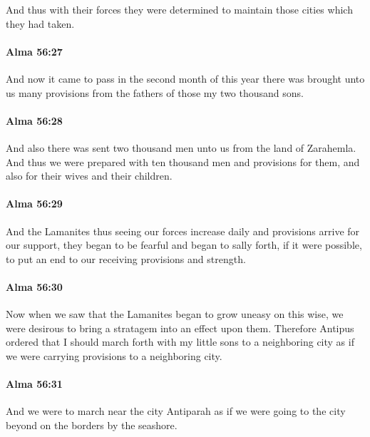 			And thus with their forces they were determined
			to maintain those cities which they had taken.

		\paragraph{Alma 56:27} %
			\label{ALMA-56-27}

			And now it came to pass in the second month of this year
			there was brought unto us many provisions
			from the fathers of those my two thousand sons.

		\paragraph{Alma 56:28} %
			\label{ALMA-56-28}

			And also there was sent two thousand men unto us from the land of Zarahemla.
			And thus we were prepared with ten thousand men
			and provisions for them, and also for their wives and their children.

		\paragraph{Alma 56:29} %
			\label{ALMA-56-29}

			And the Lamanites thus seeing our forces increase daily
			and provisions arrive for our support,
			they began to be fearful and began to sally forth,
			if it were possible, to put an end to our receiving provisions and strength.

		\paragraph{Alma 56:30} %
			\label{ALMA-56-30}

			Now when we saw that the Lamanites began to grow uneasy on this wise,
			we were desirous to bring a stratagem into an effect upon them.
			Therefore Antipus ordered that I should march forth
			with my little sons to a neighboring city
			as if we were carrying provisions to a neighboring city.

		\paragraph{Alma 56:31} %
			\label{ALMA-56-31}

			And we were to march near the city Antiparah
			as if we were going to the city beyond on the borders by the seashore.

